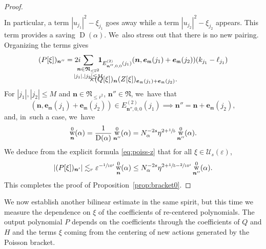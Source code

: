 \documentclass[JEP,XML,SOM,Unicode,published]{cedram}
\DeclareMathOperator{\rw}{w}
\theoremstyle{plain}
\theoremstyle{definition}
\newcommand{\nb}{{\boldsymbol n}}
\newcommand{\Nb}{{\boldsymbol{\mathfrak{N}}}}
\newcommand{\1}{\mathbf{1}}
\let\epsilon\varepsilon
\begin{document}
\begin{proof}
\begin{multline*}
\end{multline*}
In particular, a term $|u_{j_{1}}|^{2}-\xi_{j_{1}}$ goes away while a term $|u_{j_{2}}|^{2}-\xi_{j_{2}}$ appears. This term provides a saving $\operatorname{D}(\alpha)$. We~also stress out that there is no new pairing.
Organizing the terms gives
\begin{multline}
\label{eq:poiss-z}
(P[\xi])_{\nb''}
= 2i\hspace*{-4mm}\sum_{\substack{\nb\in\Nb_{\leq\overline{r}^{2}} \\ |j_{1}|,|j_{2}|\leq M}}\hspace*{-3mm}
\mathbf{1}
_{E_{\nb'',0,0}^{(2)}(j_{1})}
(
\nb,
\boldsymbol{e}_{\mathfrak{m}}(j_{1})+\boldsymbol{e}_{\mathfrak{m}}(j_{2})
)
(k_{j_{1}}-\ell_{j_{1}})\\[
-10pt]
\times(Q[\xi])_{\nb}
(Z[\xi])_{\boldsymbol{e}_{\mathfrak{m}}(j_{1})+\boldsymbol{e}_{\mathfrak{m}}(j_{2})}.
\end{multline}
For $|j_{1}|,|j_{2}|\leq M$ and $\nb\in\Nb_{\leq\overline{r}^{2}}$, $\nb''\in\Nb$, we~have that
\begin{equation}
\label{eq:rel}
(
\nb,
\boldsymbol{e}_{\mathfrak{m}}(j_{1})+\boldsymbol{e}_{\mathfrak{m}}(j_{2})
)
\in
E_{\nb'',0,0}^{(2)}(j_{1})
\implies \nb''=\nb+\boldsymbol{e}_{\mathfrak{m}}(j_{2}),
\end{equation}
and, in~such a case, we~have
\[
\rw_{\nb}^{0}(\alpha) = \frac{1}{\operatorname{D}(\alpha)}\rw_{\nb''}^{0}(\alpha) = N_{\alpha}^{-2s}\eta^{2+\sfrac{1}{5}}\rw_{\nb''}^{0}(\alpha).
\]
We deduce from the explicit formula \eqref{eq:poiss-z} that for all $\xi\in\mathcal{U}_{s}(\epsilon)$,
\begin{equation}
\label{eq:pr-z}
|(P[\xi])_{\nb'}|
\lesssim_{r}\epsilon^{-\sfrac{1}{10^{4}}}
\rw_{\nb}^{0}(\alpha)
\leq
N_{\alpha}^{-2s}\eta^{2+\sfrac{1}{5}-\sfrac{2}{10^{4}}}\rw_{\nb''}^{0}(\alpha).
\end{equation}
This completes the proof of Proposition~\ref{prop:bracket0}.
\end{proof}

We now establish another bilinear estimate in the same spirit, but this time we measure the dependence on $\xi$ of the coefficients of re-centered polynomials. The output polynomial $P$ depends on the coefficients through the coefficients of $Q$ and $H$ and the terms $\xi$ coming from the centering of new actions generated by the Poisson bracket.
\end{document}
